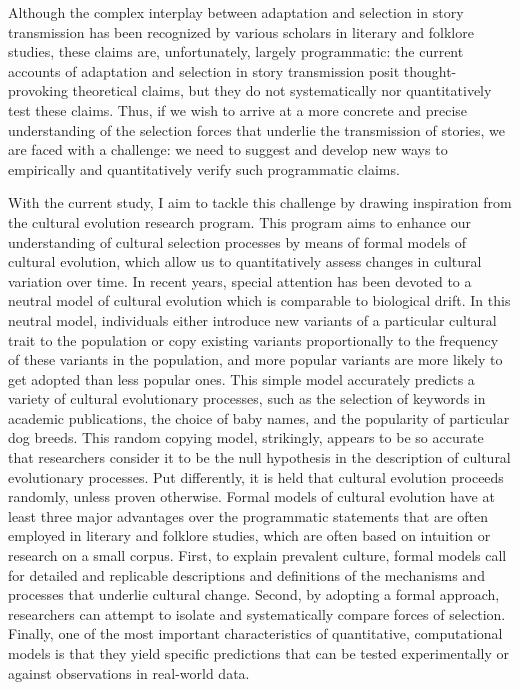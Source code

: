 Although the complex interplay between adaptation and selection in story transmission has been recognized by various scholars in literary and folklore studies\autocite[E.g.][]{boyd:2009,zipes:2006,zipes:2012,sanders:2006,hutcheon:2013}, these claims are, unfortunately, largely programmatic: the current accounts of adaptation and selection in story transmission posit thought-provoking theoretical claims, but they do not systematically nor quantitatively test these claims. Thus, if we wish to arrive at a more concrete and precise understanding of the selection forces that underlie the transmission of stories, we are faced with a challenge: we need to suggest and develop new ways to empirically and quantitatively verify such programmatic claims.

With the current study, I aim to tackle this challenge by drawing inspiration from the cultural evolution research program\autocite{sforzafeldman:1981,boyd_richerson:1985,mesoudi:2011}. This program aims to enhance our understanding of cultural selection processes by means of formal models of cultural evolution, which allow us to quantitatively assess changes in cultural variation over time. In recent years, special attention has been devoted to a neutral model of cultural evolution which is comparable to biological drift. In this neutral model, individuals either introduce new variants of a particular cultural trait to the population or copy existing variants proportionally to the frequency of these variants in the population, and more popular variants are more likely to get adopted than less popular ones. This simple model accurately predicts a variety of cultural evolutionary processes, such as the selection of keywords in academic publications\autocite{Bentley:2008}, the choice of baby names\autocite{Hahn:2003}, and the popularity of particular dog breeds\autocite{herzog:2004,ghirlanda:2014}. This random copying model, strikingly, appears to be so accurate that researchers consider it to be the null hypothesis in the description of cultural evolutionary processes. Put differently, it is held that cultural evolution proceeds randomly, unless proven otherwise. Formal models of cultural evolution have at least three major advantages over the programmatic statements that are often employed in literary and folklore studies, which are often based on intuition or research on a small corpus. First, to explain prevalent culture, formal models call for detailed and replicable descriptions and definitions of the mechanisms and processes that underlie cultural change. Second, by adopting a formal approach, researchers can attempt to isolate and systematically compare forces of selection. Finally, one of the most important characteristics of quantitative, computational models is that they yield specific predictions that can be tested experimentally or against observations in real-world data\autocite[For an elaborate discussion, see][]{mesoudi:2011}.

